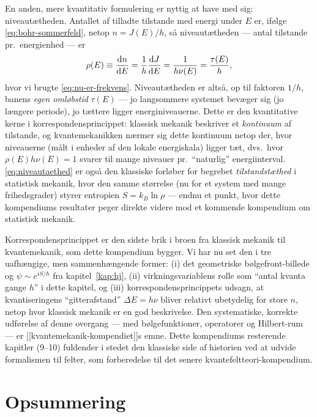 En anden, mere kvantitativ formulering er nyttig at have med sig:
niveautætheden. Antallet af tilladte tilstande med energi under $E$
er, ifølge \eqref{eq:bohr-sommerfeld}, netop $n=J(E)/h$, så
niveautætheden — antal tilstande pr.\ energienhed — er
\begin{equation}
  \rho(E)\index{niveautæthed} \equiv \dv{n}{E} = \frac{1}{h}\dv{J}{E} = \frac{1}{h\nu(E)} = \frac{\tau(E)}{h},
  \label{eq:niveautaethed}
\end{equation}
hvor vi brugte \eqref{eq:nu-er-frekvens}. Niveautætheden er altså,
op til faktoren $1/h$, banens \emph{egen omløbstid} $\tau(E)$ — jo
langsommere systemet bevæger sig (jo længere periode), jo tættere
ligger energiniveauerne. Dette er den kvantitative kerne i
korrespondensprincippet: klassisk mekanik beskriver et \emph{kontinuum}
af tilstande, og kvantemekanikken nærmer sig dette kontinuum netop
der, hvor niveauerne (målt i enheder af den lokale energiskala) ligger
tæt, dvs.\ hvor $\rho(E)h\nu(E)=1$ svarer til mange niveauer pr.\
``naturlig'' energiinterval. \eqref{eq:niveautaethed} er også den
klassiske forløber for begrebet \emph{tilstandstæthed} i statistisk
mekanik, hvor den samme størrelse (nu for et system med mange
frihedsgrader) styrer entropien $S=k_B\ln\rho$ — endnu et punkt, hvor
dette kompendiums resultater peger direkte videre mod et kommende
kompendium om statistisk mekanik.

\begin{bemaerkning}
Korrespondensprincippet er den sidste brik i broen fra klassisk
mekanik til kvantemekanik, som dette kompendium bygger. Vi har nu set
den i tre uafhængige, men sammenhængende former: (i) det geometriske
bølgefront-billede og $\psi\sim e^{iS/\hbar}$ fra
kapitel~\ref{kap:hj}, (ii) virkningsvariablens rolle som ``antal
kvanta gange $h$'' i dette kapitel, og (iii) korrespondensprincippets
udsagn, at kvantiseringens ``gitterafstand'' $\Delta E=h\nu$ bliver
relativt ubetydelig for store $n$, netop hvor klassisk mekanik er en
god beskrivelse. Den systematiske, korrekte udførelse af denne
overgang — med bølgefunktioner, operatorer og Hilbert-rum — er
[[kvantemekanik-kompendiet]]s emne. Dette kompendiums resterende
kapitler (9--10) fuldender i stedet den klassiske side af historien
ved at udvide formalismen til felter, som forberedelse til det senere
kvantefeltteori-kompendium.
\end{bemaerkning}

\section{Opsummering}

